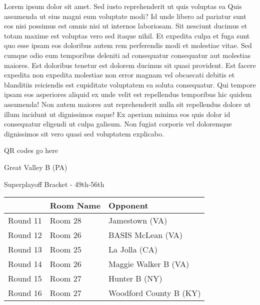 \documentclass{article}%
\begin{document}
\vspace*{8pt}%
\linebreak%
\newline%
\newline%
    Lorem ipsum dolor sit amet. Sed iusto reprehenderit ut quis voluptas ea Quis assumenda ut eius magni eum voluptate modi? Id unde libero ad pariatur sunt eos nisi possimus est omnis nisi ut internos laboriosam. Sit nesciunt ducimus et totam maxime est voluptas vero sed itaque nihil. Et expedita culpa et fuga sunt quo esse ipsam eos doloribus autem rem perferendis modi et molestiae vitae.\newline%
\newline%
    Sed cumque odio eum temporibus deleniti ad consequatur consequatur aut molestias maiores. Est doloribus tenetur est dolorem ducimus sit quasi provident. Est facere expedita non expedita molestiae non error magnam vel obcaecati debitis et blanditiis reiciendis est cupiditate voluptatem ea soluta consequatur. Qui tempore ipsam eos asperiores aliquid ex unde velit est repellendus temporibus hic quidem assumenda!\newline%
\newline%
    Non autem maiores aut reprehenderit nulla sit repellendus dolore ut illum incidunt ut dignissimos eaque! Ex aperiam minima eos quis dolor id consequatur eligendi ut culpa galisum. Non fugiat corporis vel doloremque dignissimos sit vero quasi sed voluptatem explicabo.\newline%
\newline%
\vspace*{30pt}%
\begin{center}%
\begin{Huge}%
QR codes go here%
\end{Huge}%
\end{center}%
\newpage%
\begin{center}%
\begin{Huge}%
Great Valley B (PA)%
\end{Huge}%
\vspace*{8pt}%
\linebreak%
\begin{Large}%
Superplayoff Bracket {-} 49th{-}56th%
\end{Large}%
\end{center}%
%
\begin{tabularx}{\textwidth}{|c|Y|Y|}%
\hline%
&Room Name&Opponent\\%
\hline%
Round 11&Room 28&Jamestown (VA)\\%
Round 12&Room 26&BASIS McLean (VA)\\%
Round 13&Room 25&La Jolla (CA)\\%
Round 14&Room 26&Maggie Walker B (VA)\\%
Round 15&Room 27&Hunter B (NY)\\%
Round 16&Room 27&Woodford County B (KY)\\%
\hline%
\end{tabularx}%
\end{document}
